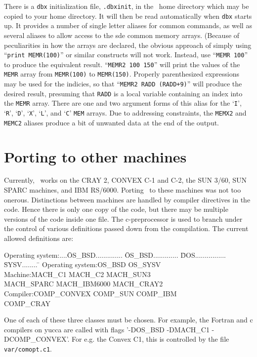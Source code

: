 There is a {\tt dbx} initialization file, {\tt .dbxinit}, in the \sde\
home directory which may be copied to your home directory.  It will
then be read automatically when {\tt dbx} starts up.  It provides 
a number of single letter aliases for common commands, as well as
several aliases to allow access to the sde common memory arrays.
(Because of peculiarities in how the arrays are declared, the obvious
approach of simply using ``{\tt print MEMR(100)}'' or similar
constructs will not work.  Instead, use ``{\tt MEMR 100}'' to produce
the equivalent result.  ``{\tt MEMR2 100 150}'' will print the values
of the {\tt MEMR} array from {\tt MEMR(100)} to {\tt MEMR(150)}.  Properly
parenthesized expressions may be used for the indicies, so that
``{\tt MEMR2 RADD (RADD+9)}'' will produce the desired result, presuming
that {\tt RADD} is a local variable containing an index into the {\tt MEMR}
array.  There are one and two argument forms of this alias for the
`{\tt I}', `{\tt R}', `{\tt D}', `{\tt X}', `{\tt L}', and `{\tt C}'
{\tt MEM} arrays.  Due to addressing constraints, the {\tt MEMX2} and
{\tt MEMC2} aliases produce a bit of unwanted data at the end of the
output.

\newpage
\section{Porting to other machines}

Currently, \sde\ works on the CRAY 2, CONVEX C-1 and C-2, the SUN 3/60,
SUN SPARC machines, and IBM RS/6000. Porting \sde\ to these machines was
not too onerous. Distinctions between machines are handled by compiler
directives in the code. Hence there is only one copy of the code, but
there may be multiple versions of the code inside one file. The
c-preprocessor is used to branch under the control of various
definitions passed down from the compilation. The current allowed
definitions are:
\begin{tabbing}
Operating system:....\=OS\_BSD.............. \= OS\_BSD............. \= DOS................ \= SYSV........ \=\kill
Operating system:\>OS\_BSD \> OS\_SYSV\\
Machine:\>MACH\_C1 \> MACH\_C2 \> MACH\_SUN3 \\
\> MACH\_SPARC \> MACH\_IBM6000 \> MACH\_CRAY2\\
Compiler:\>COMP\_CONVEX \> COMP\_SUN \> COMP\_IBM \\
\> COMP\_CRAY
\end{tabbing}
One of each of these three classes must be chosen. For example, the
Fortran and c compilers on yucca are called with flags '-DOS\_BSD
-DMACH\_C1 -DCOMP\_CONVEX'. For e.g. the Convex C1, this is controlled
by the file {\tt var/comopt.c1}.

